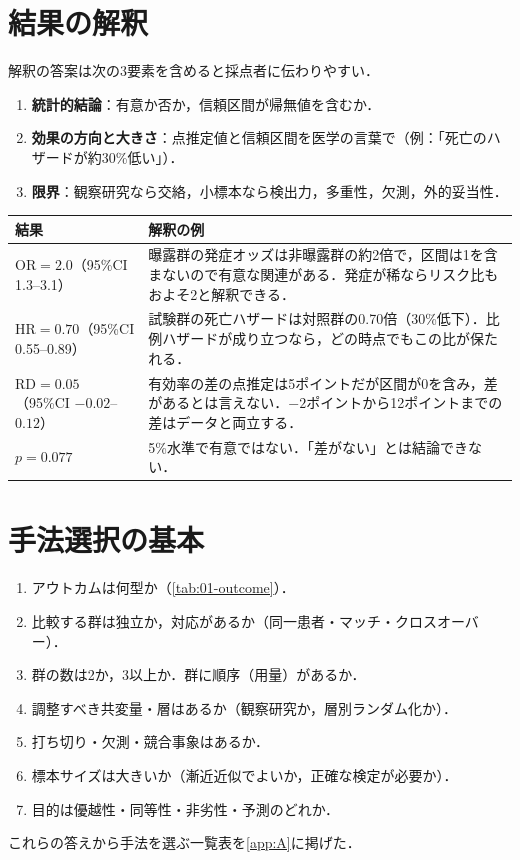 \documentclass[a4paper,11pt,openany]{ltjsbook}
\newcommand{\RD}{\mathrm{RD}}
\newcommand{\OR}{\mathrm{OR}}
\newcommand{\HR}{\mathrm{HR}}
\begin{document}
\section{結果の解釈}\label{sec:01-interp}
解釈の答案は次の3要素を含めると採点者に伝わりやすい．
\begin{enumerate}
\item \textbf{統計的結論}：有意か否か，信頼区間が帰無値を含むか．
\item \textbf{効果の方向と大きさ}：点推定値と信頼区間を医学の言葉で（例：「死亡のハザードが約30\%低い」）．
\item \textbf{限界}：観察研究なら交絡，小標本なら検出力，多重性，欠測，外的妥当性．
\end{enumerate}
\begin{center}\small
\begin{tabular}{@{}L{45mm}L{100mm}@{}}
\toprule
結果 & 解釈の例\\
\midrule
$\OR=2.0$（95\%CI 1.3--3.1） & 曝露群の発症オッズは非曝露群の約2倍で，区間は1を含まないので有意な関連がある．発症が稀ならリスク比もおよそ2と解釈できる．\\
$\HR=0.70$（95\%CI 0.55--0.89） & 試験群の死亡ハザードは対照群の0.70倍（30\%低下）．比例ハザードが成り立つなら，どの時点でもこの比が保たれる．\\
$\RD=0.05$（95\%CI $-0.02$--$0.12$） & 有効率の差の点推定は5ポイントだが区間が0を含み，差があるとは言えない．$-2$ポイントから12ポイントまでの差はデータと両立する．\\
$p=0.077$ & 5\%水準で有意ではない．「差がない」とは結論できない．\\
\bottomrule
\end{tabular}
\end{center}

\section{手法選択の基本}\label{sec:01-choice}
\begin{pointbox}[手法選択の質問リスト]
\begin{enumerate}
\item アウトカムは何型か（\cref{tab:01-outcome}）．
\item 比較する群は独立か，対応があるか（同一患者・マッチ・クロスオーバー）．
\item 群の数は2か，3以上か．群に順序（用量）があるか．
\item 調整すべき共変量・層はあるか（観察研究か，層別ランダム化か）．
\item 打ち切り・欠測・競合事象はあるか．
\item 標本サイズは大きいか（漸近近似でよいか，正確な検定が必要か）．
\item 目的は優越性・同等性・非劣性・予測のどれか．
\end{enumerate}
\end{pointbox}
これらの答えから手法を選ぶ一覧表を\cref{app:A}に掲げた．
\end{document}
